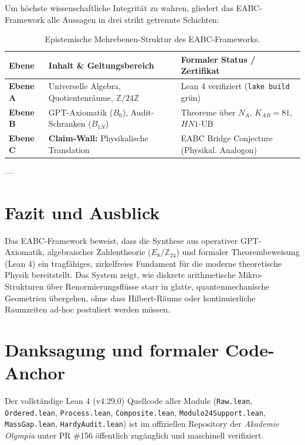 \documentclass[11pt,a4paper]{article}
\begin{document}
Um höchste wissenschaftliche Integrität zu wahren, gliedert das EABC-Framework alle Aussagen in drei strikt getrennte Schichten:

\begin{table}[h!]
\centering
\begin{tabular}{@{}lll@{}}
\toprule
\textbf{Ebene} & \textbf{Inhalt \& Geltungsbereich} & \textbf{Formaler Status / Zertifikat} \\ \midrule
\textbf{Ebene A} & Universelle Algebra, Quotientenräume, $\mathbb{Z}/24\mathbb{Z}$ & Lean 4 verifiziert (\texttt{lake build} grün) \\
\textbf{Ebene B} & GPT-Axiomatik ($B_0$), Audit-Schranken ($B_{1N}$) & Theoreme über $N_A$, $K_{AB}=81$, $HN1\text{-}\text{UB}$ \\
\textbf{Ebene C} & \textbf{Claim-Wall:} Physikalische Translation & EABC Bridge Conjecture (Physikal. Analogon) \\ \bottomrule
\end{tabular}
\caption{Epistemische Mehrebenen-Struktur des EABC-Frameworks.}
\end{table}

---

\section{Fazit und Ausblick}

Das EABC-Framework beweist, dass die Synthese aus operativer GPT-Axiomatik, algebraischer Zahlentheorie ($E_8 / \mathbb{Z}_{24}$) und formaler Theorembeweisung (Lean 4) ein tragfähiges, zirkelfreies Fundament für die moderne theoretische Physik bereitstellt. Das System zeigt, wie diskrete arithmetische Mikro-Strukturen über Renormierungsflüsse starr in glatte, quantenmechanische Geometrien übergehen, ohne dass Hilbert-Räume oder kontinuierliche Raumzeiten ad-hoc postuliert werden müssen.

\section*{Danksagung und formaler Code-Anchor}
Der vollständige Lean 4 (v4.29.0) Quellcode aller Module (\texttt{Raw.lean}, \texttt{Ordered.lean}, \texttt{Process.lean}, \texttt{Composite.lean}, \texttt{Modulo24Support.lean}, \texttt{MassGap.lean}, \texttt{HardyAudit.lean}) ist im offiziellen Repository der \emph{Akademie Olympia} unter PR \#156 öffentlich zugänglich und maschinell verifiziert.
\end{document}

